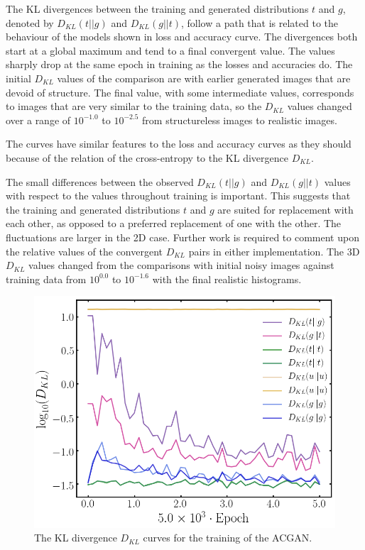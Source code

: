 \documentclass[twocolumn]{article}
\numberwithin{equation}{section}
\begin{document}
The KL divergences between the training and generated distributions $t$ and $g$, denoted by $D_{KL}(t||g)$ and 
$D_{KL}(g||t)$, follow a path that is related to the behaviour of the models shown in loss and accuracy curve. The 
divergences both start at a global maximum and tend to a final convergent value. The values sharply drop at the same epoch
in training as the losses and accuracies do. The initial $D_{KL}$ values of the comparison are with earlier generated images
that are devoid of structure. The final value, with some intermediate values, corresponds to images that are very similar 
to the training data, so the $D_{KL}$ values changed over a range of $10^{-1.0}$ to $10^{-2.5}$ from structureless images
to realistic images.

The curves have similar features to the loss and accuracy curves as they should because of the relation of the 
cross-entropy to the KL divergence $D_{KL}$.

The small differences between the observed $D_{KL}(t||g)$ and $D_{KL}(g||t)$ values with respect to the values throughout 
training is important. This suggests that the training and generated distributions $t$ and $g$ are suited for replacement
with each other, as opposed to a preferred replacement of one with the other. The fluctuations are larger in the 2D case. 
Further work is required to comment upon the relative values of the convergent $D_{KL}$ pairs in either implementation. 
The 3D $D_{KL}$ values changed from the comparisons with initial noisy images against training data from $10^{0.0}$ to 
$10^{-1.6}$ with the final realistic histograms.

\begin{figure}[!ht]%
\includegraphics[width=\columnwidth]{figures/graphs/stats.png}
\centering
\caption{The KL divergence $D_{KL}$ curves for the training of the ACGAN.}
\label{fig:2dgan_losscurve}
\end{figure}
\end{document}
